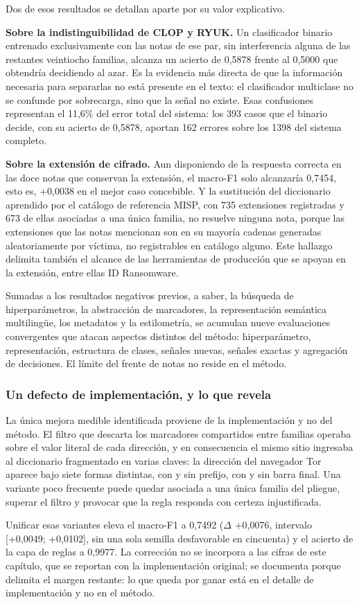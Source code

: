 Dos de esos resultados se detallan aparte por su valor explicativo.

\textbf{Sobre la indistinguibilidad de CLOP y RYUK.} Un clasificador binario entrenado exclusivamente con las notas de ese par, sin interferencia alguna de las restantes veintiocho familias, alcanza un acierto de 0,5878 frente al 0,5000 que obtendría decidiendo al azar. Es la evidencia más directa de que la información necesaria para separarlas no está presente en el texto: el clasificador multiclase no se confunde por sobrecarga, sino que la señal no existe. Esas confusiones representan el 11,6\% del error total del sistema: los 393 casos que el binario decide, con su acierto de 0,5878, aportan 162 errores sobre los 1398 del sistema completo.

\textbf{Sobre la extensión de cifrado.} Aun disponiendo de la respuesta correcta en las doce notas que conservan la extensión, el macro-F1 solo alcanzaría 0,7454, esto es, +0,0038 en el mejor caso concebible. Y la sustitución del diccionario aprendido por el catálogo de referencia MISP, con 735 extensiones registradas y 673 de ellas asociadas a una única familia, no resuelve ninguna nota, porque las extensiones que las notas mencionan son en su mayoría cadenas generadas aleatoriamente por víctima, no registrables en catálogo alguno. Este hallazgo delimita también el alcance de las herramientas de producción que se apoyan en la extensión, entre ellas ID Ransomware.

Sumadas a los resultados negativos previos, a saber, la búsqueda de hiperparámetros, la abstracción de marcadores, la representación semántica multilingüe, los metadatos y la estilometría, se acumulan nueve evaluaciones convergentes que atacan aspectos distintos del método: hiperparámetro, representación, estructura de clases, señales nuevas, señales exactas y agregación de decisiones. El límite del frente de notas no reside en el método.

\subsubsection*{Un defecto de implementación, y lo que revela}

La única mejora medible identificada proviene de la implementación y no del método. El filtro que descarta los marcadores compartidos entre familias operaba sobre el valor literal de cada dirección, y en consecuencia el mismo sitio ingresaba al diccionario fragmentado en varias claves: la dirección del navegador Tor aparece bajo siete formas distintas, con y sin prefijo, con y sin barra final. Una variante poco frecuente puede quedar asociada a una única familia del pliegue, superar el filtro y provocar que la regla responda con certeza injustificada.

Unificar esas variantes eleva el macro-F1 a 0,7492 ($\Delta$ +0,0076, intervalo [+0,0049; +0,0102], sin una sola semilla desfavorable en cincuenta) y el acierto de la capa de reglas a 0,9977. La corrección no se incorpora a las cifras de este capítulo, que se reportan con la implementación original; se documenta porque delimita el margen restante: lo que queda por ganar está en el detalle de implementación y no en el método.
